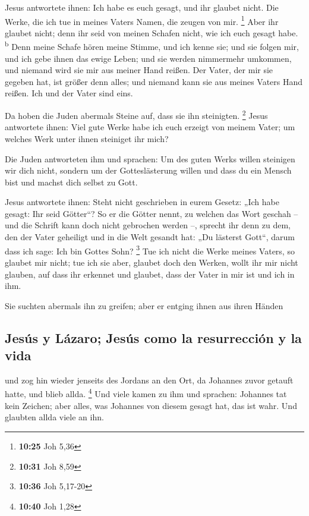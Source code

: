  Jesus antwortete ihnen: Ich habe es euch gesagt, und ihr
glaubet nicht. Die Werke, die ich tue in meines Vaters Namen, die zeugen
von mir. \footnote{\textbf{10:25} Joh 5,36}  Aber ihr
glaubet nicht; denn ihr seid von meinen Schafen nicht, wie ich euch
gesagt habe. \textsuperscript{b}  Denn meine Schafe hören
meine Stimme, und ich kenne sie; und sie folgen mir,  und
ich gebe ihnen das ewige Leben; und sie werden nimmermehr umkommen, und
niemand wird sie mir aus meiner Hand reißen.  Der Vater,
der mir sie gegeben hat, ist größer denn alles; und niemand kann sie aus
meines Vaters Hand reißen.  Ich und der Vater sind eins.

 Da hoben die Juden abermals Steine auf, dass sie ihn
steinigten. \footnote{\textbf{10:31} Joh 8,59}  Jesus
antwortete ihnen: Viel gute Werke habe ich euch erzeigt von meinem
Vater; um welches Werk unter ihnen steiniget ihr mich?

 Die Juden antworteten ihm und sprachen: Um des guten
Werks willen steinigen wir dich nicht, sondern um der Gotteslästerung
willen und dass du ein Mensch bist und machst dich selbst zu Gott.

 Jesus antwortete ihnen: Steht nicht geschrieben in eurem
Gesetz: „Ich habe gesagt: Ihr seid Götter``?  So er die
Götter nennt, zu welchen das Wort geschah -- und die Schrift kann doch
nicht gebrochen werden --,  sprecht ihr denn zu dem, den
der Vater geheiligt und in die Welt gesandt hat: „Du lästerst Gott``,
darum dass ich sage: Ich bin Gottes Sohn? \footnote{\textbf{10:36} Joh
  5,17-20}  Tue ich nicht die Werke meines Vaters, so
glaubet mir nicht;  tue ich sie aber, glaubet doch den
Werken, wollt ihr mir nicht glauben, auf dass ihr erkennet und glaubet,
dass der Vater in mir ist und ich in ihm.

 Sie suchten abermals ihn zu greifen; aber er entging
ihnen aus ihren Händen

\hypertarget{jesuxfas-y-luxe1zaro-jesuxfas-como-la-resurrecciuxf3n-y-la-vida}{%
\subsection{Jesús y Lázaro; Jesús como la resurrección y la
vida}\label{jesuxfas-y-luxe1zaro-jesuxfas-como-la-resurrecciuxf3n-y-la-vida}}

 und zog hin wieder jenseits des Jordans an den Ort, da
Johannes zuvor getauft hatte, und blieb allda. \footnote{\textbf{10:40}
  Joh 1,28}  Und viele kamen zu ihm und sprachen:
Johannes tat kein Zeichen; aber alles, was Johannes von diesem gesagt
hat, das ist wahr.  Und glaubten allda viele an ihn.

